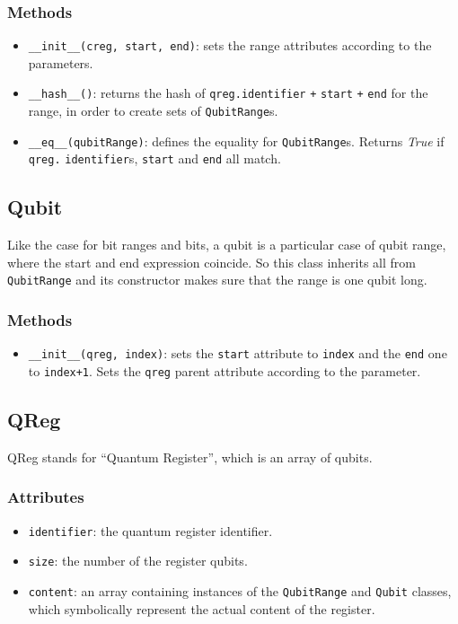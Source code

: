 \documentclass[12pt,a4paper]{report}
\theoremstyle{definition}
\theoremstyle{definition}
\theoremstyle{definition}
\begin{document}
\subsubsection{Methods}
\begin{itemize}
    \itemsep 0em
    \item \texttt{\_\_init\_\_(creg, start, end)}: sets the range attributes according to the parameters.
    \item \texttt{\_\_hash\_\_()}: returns the hash of \texttt{qreg.identifier} \texttt{+} \texttt{start} \texttt{+} \texttt{end} for the range, in order to create sets of \texttt{QubitRange}s.
    \item \texttt{\_\_eq\_\_(qubitRange)}: defines the equality for \texttt{QubitRange}s. Returns \textit{True} if \texttt{qreg.} \texttt{identifier}s, \texttt{start} and \texttt{end} all match.
\end{itemize}

\subsection{Qubit}
Like the case for bit ranges and bits, a qubit is a particular case of qubit range, where the start and end expression coincide. So this class inherits all from \texttt{QubitRange} and its constructor makes sure that the range is one qubit long.
\subsubsection{Methods}
\begin{itemize}
    \itemsep 0em
    \item \texttt{\_\_init\_\_(qreg, index)}: sets the \texttt{start} attribute to \texttt{index} and the \texttt{end} one to \texttt{index+1}. Sets the \texttt{qreg} parent attribute according to the parameter.
\end{itemize}


\subsection{QReg}
QReg stands for ``Quantum Register'', which is an array of qubits.
\subsubsection{Attributes}
\begin{itemize}
    \itemsep 0em
    \item \texttt{identifier}: the quantum register identifier.
    \item \texttt{size}: the number of the register qubits.
    \item \texttt{content}: an array containing instances of the \texttt{QubitRange} and \texttt{Qubit} classes, which symbolically represent the actual content of the register.
\end{itemize}
\end{document}
